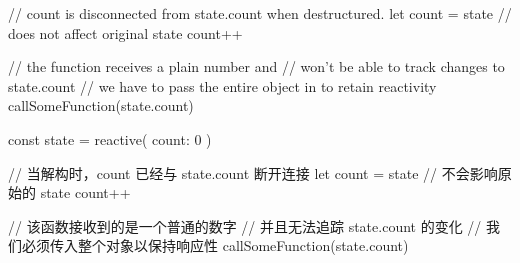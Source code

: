 \begin{enumerate}
\begin{paracol}{2}
\begin{codeJs}
// count is disconnected from state.count when destructured.
let { count } = state
// does not affect original state
count++

// the function receives a plain number and
// won't be able to track changes to state.count
// we have to pass the entire object in to retain reactivity
callSomeFunction(state.count)
\end{codeJs}
\switchcolumn
\begin{codeJs}
const state = reactive({ count: 0 })

// 当解构时，count 已经与 state.count 断开连接
let { count } = state
// 不会影响原始的 state
count++

// 该函数接收到的是一个普通的数字
// 并且无法追踪 state.count 的变化
// 我们必须传入整个对象以保持响应性
callSomeFunction(state.count)
\end{codeJs}
\end{paracol}
\end{enumerate} 



